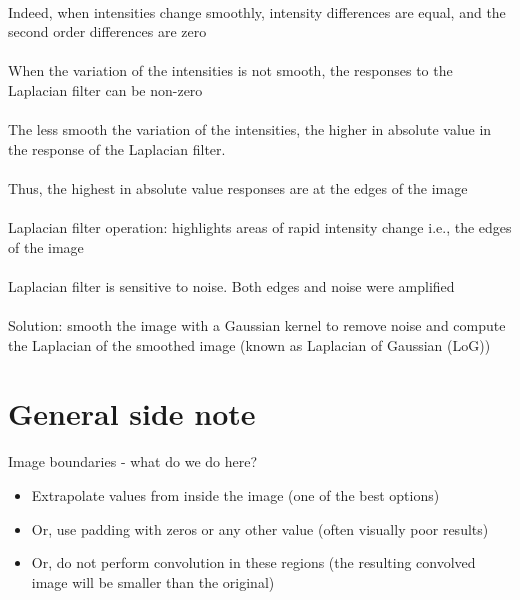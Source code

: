 \documentclass{article}[18pt]
\begin{document}
\\
Indeed, when intensities change smoothly, intensity differences are equal, and the second order differences are zero\\
\\
When the variation of the intensities is not smooth, the responses to the Laplacian filter can be non-zero\\
\\
The less smooth the variation of the intensities, the higher in absolute value in the response of the Laplacian filter.\\
\\
Thus, the highest in absolute value responses are at the edges of the image\\
\\
Laplacian filter operation: highlights areas of rapid intensity change i.e., the edges of the image\\
\\
Laplacian filter is sensitive to noise. Both edges and noise were amplified\\
\\
Solution: smooth the image with a Gaussian kernel to remove noise and compute the Laplacian of the smoothed image (known as Laplacian of Gaussian (LoG))
\section{General side note}
Image boundaries - what do we do here?
\begin{itemize}
	\item Extrapolate values from inside the image (one of the best options)
	\item Or, use padding with zeros or any other value (often visually poor results)
	\item Or, do not perform convolution in these regions (the resulting convolved image will be smaller than the original)
\end{itemize}
\end{document}
